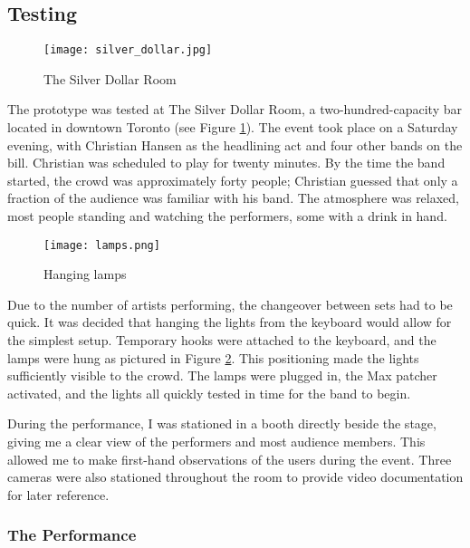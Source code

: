 \subsection{Testing}

\begin{figure}
	\centering

	\texttt{[image: silver\_dollar.jpg]}
	\caption{The Silver Dollar Room}

	\label{prototyping3.8}
\end{figure}

The prototype was tested at The Silver Dollar Room, a two-hundred-capacity bar located in downtown Toronto (see Figure \ref{prototyping3.8}). The event took place on a Saturday evening, with Christian Hansen as the headlining act and four other bands on the bill. Christian was scheduled to play for twenty minutes. By the time the band started, the crowd was approximately forty people; Christian guessed that only a fraction of the audience was familiar with his band. The atmosphere was relaxed, most people standing and watching the performers, some with a drink in hand.

\begin{figure}
	\centering

	\texttt{[image: lamps.png]}
	\caption{Hanging lamps}

	\label{prototyping3.9}
\end{figure}

Due to the number of artists performing, the changeover between sets had to be quick. It was decided that hanging the lights from the keyboard would allow for the simplest setup. Temporary hooks were attached to the keyboard, and the lamps were hung as pictured in Figure \ref{prototyping3.9}. This positioning made the lights sufficiently visible to the crowd. The lamps were plugged in, the Max patcher activated, and the lights all quickly tested in time for the band to begin.

During the performance, I was stationed in a booth directly beside the stage, giving me a clear view of the performers and most audience members. This allowed me to make first-hand observations of the users during the event. Three cameras were also stationed throughout the room to provide video documentation for later reference.

\subsubsection{The Performance}


